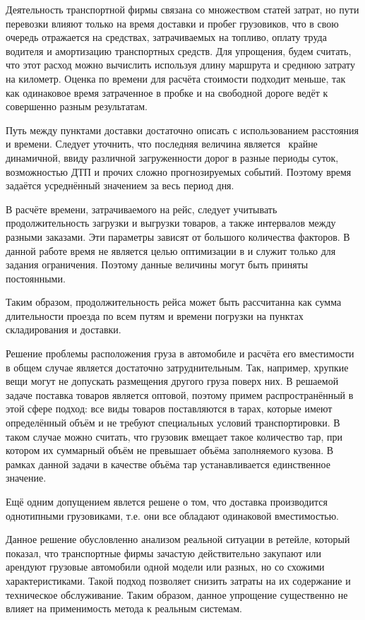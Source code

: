 	Деятельность транспортной фирмы связана со множеством статей затрат, но пути перевозки влияют только на время доставки и пробег грузовиков, что в свою очередь отражается на средствах, затрачиваемых на топливо, оплату труда водителя и амортизацию транспортных средств. Для упрощения, будем считать, что этот расход можно вычислить используя длину маршрута и среднюю затрату на километр. Оценка по времени для расчёта стоимости подходит меньше, так как одинаковое время затраченное в пробке и на свободной дороге ведёт к совершенно разным результатам\cite{subj:fuel_waste}.
	
	Путь между пунктами доставки достаточно описать с использованием расстояния и времени. Следует уточнить, что последняя величина является \, крайне динамичной, ввиду различной загруженности дорог в разные периоды суток, возможностью ДТП и прочих сложно прогнозируемых событий. Поэтому время задаётся усреднённый значением за весь период дня.
	
	В расчёте времени, затрачиваемого на рейс, следует учитывать продолжительность загрузки и выгрузки товаров, а также интервалов между разными заказами. Эти параметры зависят от большого количества факторов. В данной работе время не является целью оптимизации в и служит только для задания ограничения. Поэтому данные величины могут быть приняты постоянными.
	
	Таким образом, продолжительность рейса может быть рассчитанна как сумма длительности проезда по всем путям и времени погрузки на пунктах складирования и доставки.
	
	Решение проблемы расположения груза в автомобиле и расчёта его вместимости в общем случае является достаточно затруднительным. Так, например, хрупкие вещи могут не допускать размещения другого груза поверх них. В решаемой задаче поставка товаров является оптовой, поэтому примем распространённый в этой сфере подход: все виды товаров поставляются в тарах, которые имеют определённый объём и не требуют специальных условий транспортировки. В таком случае можно считать, что грузовик вмещает такое количество тар, при котором их суммарный объём не превышает объёма заполняемого кузова. В рамках данной задачи в качестве объёма тар устанавливается единственное значение. 
	
	Ещё одним допущением явлется решене о том, что доставка производится однотипными грузовиками, т.е. они все обладают одинаковой вместимостью.
	
	Данное решение обусловленно анализом реальной ситуации в ретейле, который показал, что транспортные фирмы зачастую действительно закупают или арендуют грузовые автомобили одной модели или разных, но со схожими характеристиками. Такой подход позволяет снизить затраты на их содержание и техническое обслуживание. Таким образом, данное упрощение существенно не влияет на применимость метода к реальным системам.
	
